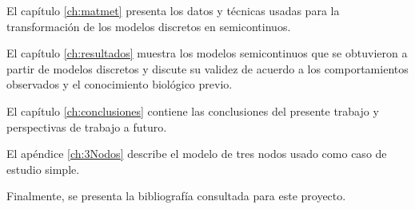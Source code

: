 El capítulo \ref{ch:matmet} presenta los datos y técnicas usadas para la transformación de los modelos discretos en semicontinuos.

El capítulo \ref{ch:resultados} muestra los modelos semicontinuos que se obtuvieron a partir de modelos discretos y discute su validez de acuerdo a los comportamientos observados y el conocimiento biológico previo.

El capítulo \ref{ch:conclusiones} contiene las conclusiones del presente trabajo y perspectivas de trabajo a futuro.

El apéndice \ref{ch:3Nodos} describe el modelo de tres nodos usado como caso de estudio simple.

Finalmente, se presenta la bibliografía consultada para este proyecto.




